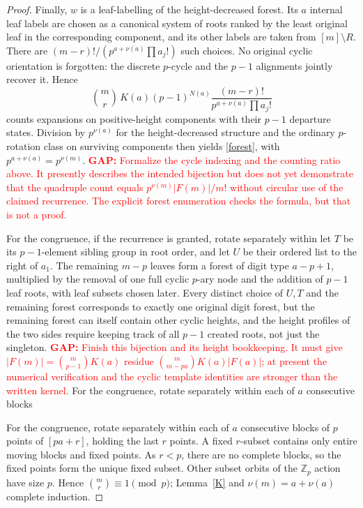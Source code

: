 \documentclass[10pt]{article}
\theoremstyle{definition}\newtheorem*{definition}{Definition}
\theoremstyle{remark}\newtheorem*{remark}{Remark}
\newcommand{\GAP}[1]{\textcolor{red}{\textbf{GAP: }#1}}
\begin{document}
\begin{proof}
Finally, $w$ is a leaf-labelling of the height-decreased forest. Its $a$
internal leaf labels are chosen as a canonical system of roots ranked by the
least original leaf in the corresponding component, and its other labels are
taken from $[m]\setminus R$. There are $(m-r)!/(p^{a+\nu(a)}\prod a_j!)$ such
choices. No original cyclic orientation is forgotten: the discrete $p$-cycle
and the $p-1$ alignments jointly recover it. Hence
\[
 \binom mr\,K(a)(p-1)^{N(a)}\frac{(m-r)!}{p^{a+\nu(a)}\prod a_j!}
\]
counts expansions on positive-height components with their $p-1$ departure
states. Division by $p^{\nu(a)}$ for the height-decreased structure and the
ordinary $p$-rotation class on surviving components then yields
\eqref{forest}, with $p^{a+\nu(a)}=p^{\nu(m)}$. \GAP{Formalize the cycle
indexing and the counting ratio above. It presently describes the intended
bijection but does not yet demonstrate that the quadruple count equals
$p^{\nu(m)}|F(m)|/m!$ without circular use of the claimed recurrence. The
explicit forest enumeration checks the formula, but that is not a proof.}

For the congruence, if the recurrence is granted, rotate separately within let $T$ be its
$p-1$-element sibling group in root order, and let $U$ be their ordered list
to the right of $a_1$. The remaining $m-p$ leaves form a forest of digit type
$a - p+1$, multiplied by the removal of one full cyclic $p$-ary node and the
addition of $p-1$ leaf roots, with leaf subsets chosen later. Every distinct
choice of $U,T$ and the remaining forest corresponds to exactly one original
digit forest, but the remaining forest can itself contain other cyclic
heights, and the height profiles of the two sides require keeping track of
all $p-1$ created roots, not just the singleton. \GAP{Finish this bijection
and its height bookkeeping. It must give $|F(m)|=\binom{m}{p-1}K(a)$ residue
$\binom{m}{m-pa}K(a)|F(a)|$; at present the numerical verification and the
cyclic template identities are stronger than the written kernel.}
For the congruence, rotate separately within each of $a$ consecutive blocks

For the congruence, rotate separately within each of $a$ consecutive blocks
of $p$ points of $[pa+r]$, holding the last $r$ points. A fixed $r$-subset
contains only entire moving blocks and fixed points. As $r<p$, there are no
complete blocks, so the fixed points form the unique fixed subset. Other
subset orbits of the $\mathbb Z_p$ action have size $p$. Hence
$\binom mr\equiv1\pmod p$; Lemma~\ref{K} and $\nu(m)=a+\nu(a)$ complete induction.\end{proof}
\end{document}
